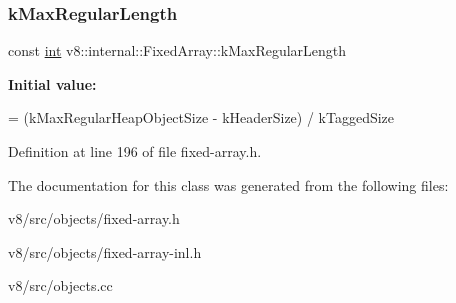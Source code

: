 \subsubsection{\texorpdfstring{k\+Max\+Regular\+Length}{kMaxRegularLength}}
{\footnotesize\ttfamily const \mbox{\hyperlink{classint}{int}} v8\+::internal\+::\+Fixed\+Array\+::k\+Max\+Regular\+Length\hspace{0.3cm}{\ttfamily [static]}}

{\bfseries Initial value\+:}
\begin{DoxyCode}
=
      (kMaxRegularHeapObjectSize - kHeaderSize) / kTaggedSize
\end{DoxyCode}


Definition at line 196 of file fixed-\/array.\+h.



The documentation for this class was generated from the following files\+:\begin{DoxyCompactItemize}
\item 
v8/src/objects/fixed-\/array.\+h\item 
v8/src/objects/fixed-\/array-\/inl.\+h\item 
v8/src/objects.\+cc\end{DoxyCompactItemize}
